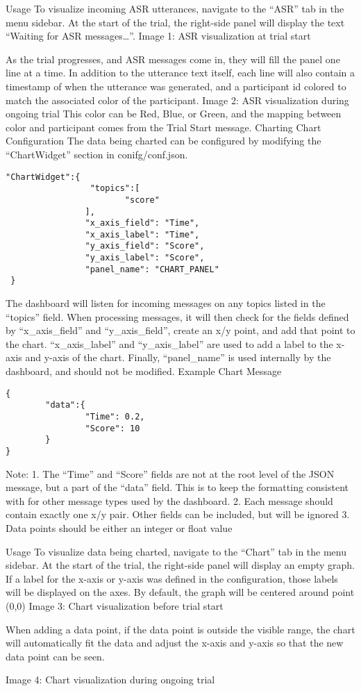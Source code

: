 Usage
To visualize incoming ASR utterances, navigate to the ``ASR” tab in the menu sidebar. At the start of the trial, the right-side panel will display the text ``Waiting for ASR messages…”.
Image 1: ASR visualization at trial start

As the trial progresses, and ASR messages come in, they will fill the panel one line at a time. In addition to the utterance text itself, each line will also contain a timestamp of when the utterance was generated, and a participant id colored to match the associated color of the participant.
Image 2: ASR visualization during ongoing trial
This color can be Red, Blue, or Green, and the mapping between color and participant comes from the Trial Start message.
Charting
Chart Configuration
The data being charted can be configured by modifying the ``ChartWidget” section in conifg/conf.json.

\begin{verbatim}
"ChartWidget":{
                 "topics":[
                        "score"
                ],
                "x_axis_field": "Time",
                "x_axis_label": "Time",
                "y_axis_field": "Score",
                "y_axis_label": "Score",
                "panel_name": "CHART_PANEL"
 }
\end{verbatim}

The dashboard will listen for incoming messages on any topics listed in the
``topics” field. When processing messages, it will then check for the fields
defined by ``x\_axis\_field'' and ``y\_axis\_field”, create an x/y point, and
add that point to the chart. ``x\_axis\_label'' and ``y\_axis\_label'' are used to
add a label to the x-axis and y-axis of the chart. Finally, ``panel\_name'' is
used internally by the dashboard, and should not be modified.  Example Chart
Message

\begin{verbatim}
{
        "data":{
                "Time": 0.2,
                "Score": 10
        }
}
\end{verbatim}



Note:
1. The ``Time” and ``Score” fields are not at the root level of the JSON message, but a part of the ``data” field. This is to keep the formatting consistent with for other message types used by the dashboard.
2. Each message should contain exactly one x/y pair. Other fields can be included, but will be ignored
3. Data points should be either an integer or float value

Usage
To visualize data being charted, navigate to the ``Chart” tab in the menu sidebar. At the start of the trial, the right-side panel will display an empty graph. If a label for the x-axis or y-axis was defined in the configuration, those labels will be displayed on the axes.  By default, the graph will be centered around point (0,0)
Image 3: Chart visualization before trial start

When adding a data point, if the data point is outside the visible range, the chart will automatically fit the data and adjust the x-axis and y-axis so that the new data point can be seen.


Image 4: Chart visualization during ongoing trial
